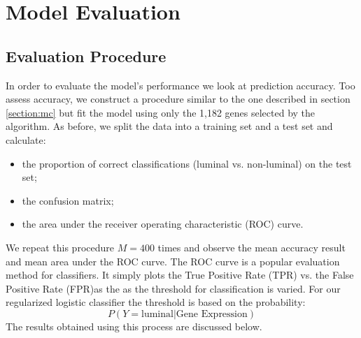\documentclass[12pt,a4paper]{article}
\begin{document}
\section{Model Evaluation }
\subsection{Evaluation Procedure}
In order to evaluate the model's performance we look at prediction accuracy. Too assess accuracy, we construct a procedure similar to the one described in section \ref{section:mc} but fit the model using only the 1,182 genes selected by the algorithm. As before, we split the data into a training set and a test set and calculate:
\begin{itemize}
\item the proportion of correct classifications (luminal vs. non-luminal) on the test set;
\item the confusion matrix;
\item the area under the receiver operating characteristic (ROC) curve.
\end{itemize}
We repeat this procedure $M = 400$ times and observe the mean accuracy result and mean area under the ROC curve. The ROC curve is a popular evaluation method for classifiers. It simply plots the True Positive Rate (TPR) vs. the False Positive Rate (FPR)as the as the threshold for classification is varied. For our regularized logistic classifier the threshold is based on the probability:
\[
P\left(Y=\text{luminal}|\text{Gene Expression}\right)
\]
The results obtained using this process are discussed below.
\end{document}

